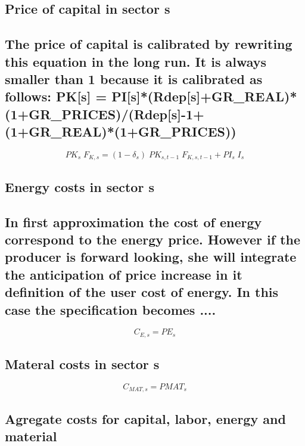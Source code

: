 \documentclass[12pt]{article}
\numberwithin{equation}{section}
\begin{document}
\subsection{Price of capital in sector s}




\subsection{The price of capital is calibrated by rewriting this equation in the long run. It is always smaller than 1 because it is calibrated as follows: PK[s] = PI[s]*(Rdep[s]+GR_REAL)*(1+GR_PRICES)/(Rdep[s]-1+(1+GR_REAL)*(1+GR_PRICES))}


\begin{dmath}
PK_{s} \; F_{K, s} = \left( 1 - \delta_{s} \right) \; PK_{s, t-1} \; F_{K, s, t-1} + PI_{s} \; I_{s}
\end{dmath}



\subsection{Energy costs in sector s}




\subsection{In first approximation the cost of energy correspond to the energy price. However if the producer is forward looking, she will integrate the anticipation of price increase in it definition of the user cost of energy. In this case the specification becomes ....}


\begin{dmath}
C_{E, s} = PE_{s}
\end{dmath}



\subsection{Materal costs in sector s}


\begin{dmath}
C_{MAT, s} = PMAT_{s}
\end{dmath}



\subsection{Agregate costs for capital, labor, energy and material}
\end{document}
